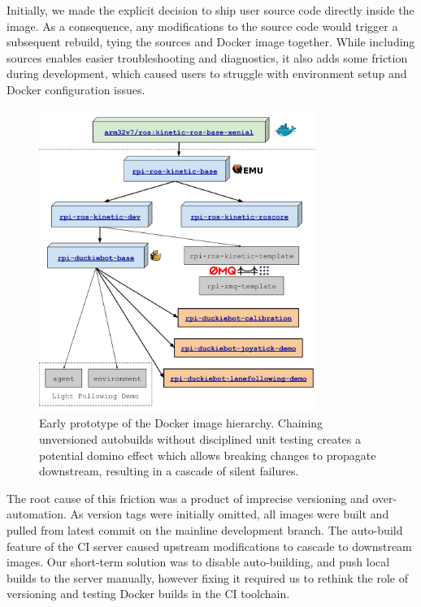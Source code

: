 Initially, we made the explicit decision to ship user source code directly inside the image. As a consequence, any modifications to the source code would trigger a subsequent rebuild, tying the sources and Docker image together. While including sources enables easier troubleshooting and diagnostics, it also adds some friction during development, which caused users to struggle with environment setup and Docker configuration issues.

\begin{figure}
\includegraphics[width=0.80\textwidth]{../figures/image_provenance.png}
\caption{Early prototype of the Docker image hierarchy. Chaining unversioned autobuilds without disciplined unit testing creates a potential domino effect which allows breaking changes to propagate downstream, resulting in a cascade of silent failures.}
\label{fig:early_prototype}
\end{figure}

The root cause of this friction was a product of imprecise versioning and over-automation. As version tags were initially omitted, all images were built and pulled from latest commit on the mainline development branch. The auto-build feature of the CI server caused upstream modifications to cascade to downstream images. Our short-term solution was to disable auto-building, and push local builds to the server manually, however fixing it required us to rethink the role of versioning and testing Docker builds in the CI toolchain.

